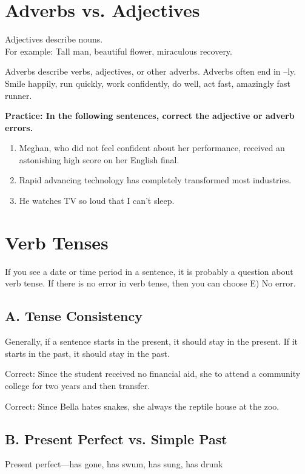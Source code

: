 \documentclass[12pt]{book}
\newcommand{\longline}{\underline{\hspace{2in}} }
\begin{document}
\section{Adverbs vs. Adjectives}
Adjectives describe nouns.\\
For example: Tall man, beautiful flower, miraculous recovery.  

\bigskip
Adverbs describe verbs, adjectives, or other adverbs.  Adverbs often end in –ly.\\
Smile happily, run quickly, work confidently, do well, act fast, amazingly fast runner.

\bigskip
\textbf{Practice: In the following sentences, correct the adjective or adverb errors.}
\begin{enumerate}
\item{Meghan, who did not feel confident about her performance, received an astonishing high score on her English final.}
\item{Rapid advancing technology has completely transformed most industries.}
\item{He watches TV so loud that I can't sleep.}
\end{enumerate}

\section{Verb Tenses}
If you see a date or time period in a sentence, it is probably a question about verb tense.  If there is no error in verb tense, then you can choose E) No error.

\bigskip
\subsection{A. Tense Consistency}
Generally, if a sentence starts in the present, it should stay in the present.  If it starts in the past, it should stay in the past.

\bigskip
Correct:  Since the student received no financial aid, she \longline to attend a community college for two years and then transfer.

\bigskip
Correct:  Since Bella hates snakes, she always \longline the reptile house at the zoo.

\subsection{B. Present Perfect vs. Simple Past}
Present perfect—has gone, has swum, has sung, has drunk
\end{document}
